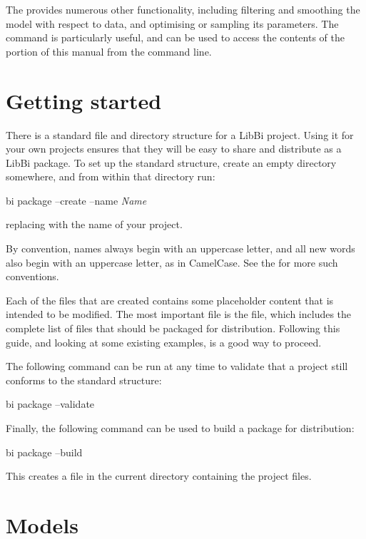 The  provides numerous
other functionality, including filtering and smoothing the model with respect
to data, and optimising or sampling its parameters. The 
command is particularly useful, and can be used to access the contents of the
 portion of this manual from the
command line.

\section{Getting started}\label{Getting_started}

There is a standard file and directory structure for a LibBi project. Using it
for your own projects ensures that they will be easy to share and distribute
as a LibBi package. To set up the standard structure, create an empty
directory somewhere, and from within that directory run:
\begin{cmdcode}
bi package --create --name \emph{Name}
\end{cmdcode}
replacing  with the name of your project.

\begin{tip}
By convention, names always begin with an uppercase letter, and all new words
also begin with an uppercase letter, as in CamelCase. See the
 for more such conventions.
\end{tip}

Each of the files that are created contains some placeholder content that is
intended to be modified. The most important file is the  file,
which includes the complete list of files that should be packaged for
distribution. Following this guide, and looking at some existing examples, is
a good way to proceed.

The following command can be run at any time to validate that a project still
conforms to the standard structure:
\begin{cmdcode}
bi package --validate
\end{cmdcode}

Finally, the following command can be used to build a package for
distribution:
\begin{cmdcode}
bi package --build
\end{cmdcode}
This creates a  file in the current directory containing the
project files.

\section{Models\label{Models}}

